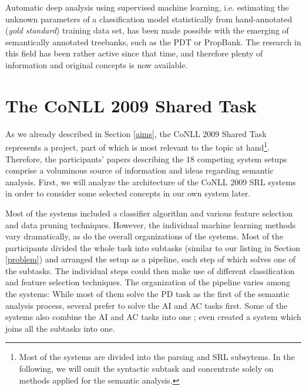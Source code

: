 \documentclass[12pt,notitlepage]{report}
\begin{document}
Automatic deep analysis using supervised machine learning, i.e. estimating the unknown parameters of a classification model statistically from hand-annotated (\emph{gold standard}) training data set, has been made possible with the emerging of semantically annotated treebanks, such as the PDT or PropBank. The research in this field has been rather active since that time, and therefore plenty of information and original concepts is now available. 

\section{The CoNLL 2009 Shared Task}\label{conll2009}

As we already described in Section \ref{aims}, the CoNLL 2009 Shared Task represents a project, part of which is most relevant to the topic at hand\footnote{Most of the systems are divided into the parsing and SRL subsytems. In the following, we will omit the syntactic subtask and concentrate solely on methods applied for the semantic analysis.}. Therefore, the participants' papers describing the 18 competing system setups comprise a voluminous source of information and ideas regarding semantic analysis. First, we will analyze the architecture of the CoNLL 2009 SRL systems in order to consider some selected concepts in our own system later. 

Most of the systems included a classifier algorithm and various feature selection and data pruning techniques. However, the individual machine learning methods vary dramatically, as do the overall organizations of the systems. Most of the participants divided the whole task into subtasks (similar to our listing in Section \ref{problem}) and arranged the setup as a pipeline, each step of which solves one of the subtasks. The individual steps could then make use of different classification and feature selection techniques. The organization of the pipeline varies among the systems: While most of them solve the PD task as the first of the semantic analysis process, several \citep{bohnet09,zhao09} prefer to solve the AI and AC tasks first. Some of the systems also combine the AI and AC tasks into one \citep{che09,nugues09}; \citet{meza-ruiz09} even created a system which joins all the subtasks into one. 
\end{document}
